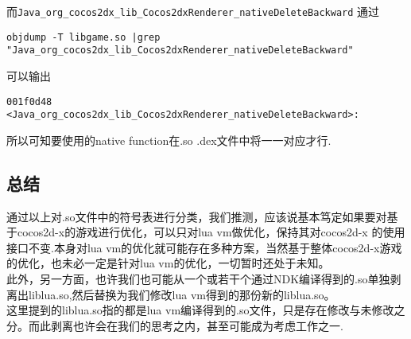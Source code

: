 而\verb|Java_org_cocos2dx_lib_Cocos2dxRenderer_nativeDeleteBackward|
通过\\
\begin{lstlisting}
objdump -T libgame.so |grep "Java_org_cocos2dx_lib_Cocos2dxRenderer_nativeDeleteBackward"
\end{lstlisting}

可以输出
\begin{lstlisting}
001f0d48 <Java_org_cocos2dx_lib_Cocos2dxRenderer_nativeDeleteBackward>:
\end{lstlisting}
所以可知要使用的native function在.so .dex文件中将一一对应才行.\\
\subsection{总结}
\label{sec:so:conclusion}
通过以上对.so文件中的符号表进行分类，我们推测，应该说基本笃定如果要对基于cocos2d-x的游戏进行优化，可以只对lua vm做优化，保持其对cocos2d-x
的使用接口不变.本身对lua vm的优化就可能存在多种方案，当然基于整体cocos2d-x游戏的优化，也未必一定是针对lua vm的优化，一切暂时还处于未知。\\
此外，另一方面，也许我们也可能从一个或若干个通过NDK编译得到的.so单独剥离出liblua.so,然后替换为我们修改lua vm得到的那份新的liblua.so。\\
这里提到的liblua.so指的都是lua vm编译得到的.so文件，只是存在修改与未修改之分。而此剥离也许会在我们的思考之内，甚至可能成为考虑工作之一.\\
